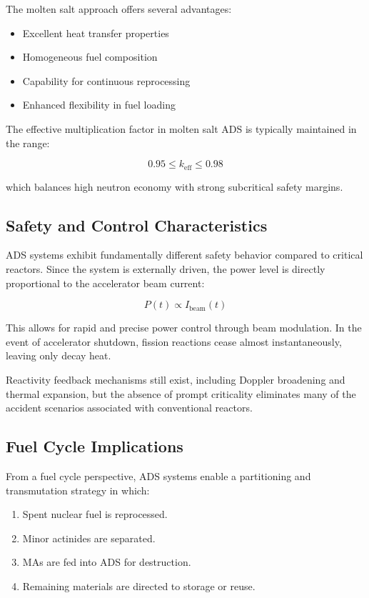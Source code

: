 The molten salt approach offers several advantages:

\begin{itemize}
\item Excellent heat transfer properties
\item Homogeneous fuel composition
\item Capability for continuous reprocessing
\item Enhanced flexibility in fuel loading
\end{itemize}

The effective multiplication factor in molten salt ADS is typically maintained in the range:

\begin{equation}
0.95 \leq k_{\text{eff}} \leq 0.98
\end{equation}

which balances high neutron economy with strong subcritical safety margins.

\subsection{Safety and Control Characteristics}

ADS systems exhibit fundamentally different safety behavior compared to critical reactors. Since the system is externally driven, 
the power level is directly proportional to the accelerator beam current:

\begin{equation}
P(t) \propto I_{\text{beam}}(t)
\end{equation}

This allows for rapid and precise power control through beam modulation. In the event of accelerator shutdown, fission reactions 
cease almost instantaneously, leaving only decay heat.

Reactivity feedback mechanisms still exist, including Doppler broadening and thermal expansion, but the absence of prompt 
criticality eliminates many of the accident scenarios associated with conventional reactors.

\subsection{Fuel Cycle Implications}

From a fuel cycle perspective, ADS systems enable a partitioning and transmutation strategy in which:

\begin{enumerate}
\item Spent nuclear fuel is reprocessed.
\item Minor actinides are separated.
\item MAs are fed into ADS for destruction.
\item Remaining materials are directed to storage or reuse.
\end{enumerate}

